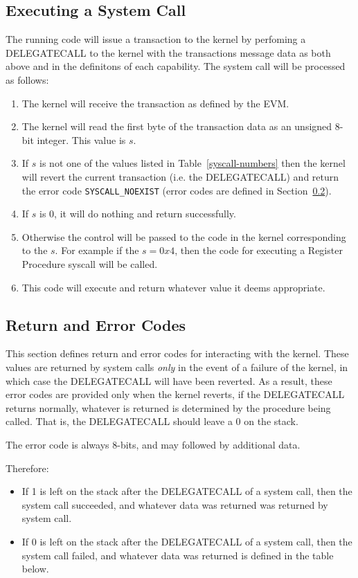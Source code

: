 \documentclass[english,a4paper]{article}
\begin{document}
\subsection{Executing a System Call}
The running code will issue a transaction to the kernel by perfoming a
DELEGATECALL to the kernel with the transactions message data as both above and
in the definitons of each capability. The system call will be processed as
follows:

\begin{enumerate}
  \item The kernel will receive the transaction as defined by the EVM.
  \item The kernel will read the first byte of the transaction data as an
  unsigned 8-bit integer. This value is $s$.
  \item If $s$ is not one of the values listed in Table~\ref{syscall-numbers}
  then the kernel will revert the current transaction (i.e. the DELEGATECALL)
  and return the error code \texttt{SYSCALL\_NOEXIST} (error codes are defined
  in Section~\ref{errors}).
  \item If $s$ is 0, it will do nothing and return successfully.
  \item Otherwise the control will be passed to the code in the kernel
  corresponding to the $s$. For example if the $s = 0x4$, then the code for
  executing a Register Procedure syscall will be called.
  \item This code will execute and return whatever value it deems appropriate.
\end{enumerate}

\subsection{Return and Error Codes}\label{errors}
This section defines return and error codes for interacting with the kernel.
These values are returned by system calls \emph{only} in the event of a failure
of the kernel, in which case the DELEGATECALL will have been reverted. As a
result, these error codes are provided only when the kernel reverts, if the
DELEGATECALL returns normally, whatever is returned is determined by the
procedure being called. That is, the DELEGATECALL should leave a 0 on the stack.

The error code is always 8-bits, and may followed by additional data.

Therefore:

\begin{itemize}
  \item If 1 is left on the stack after the DELEGATECALL of a system call, then
  the system call succeeded, and whatever data was returned was returned by
  system call.
  \item If 0 is left on the stack after the DELEGATECALL of a system call, then
  the system call failed, and whatever data was returned is defined in the table
  below.
\end{itemize}
\end{document}
